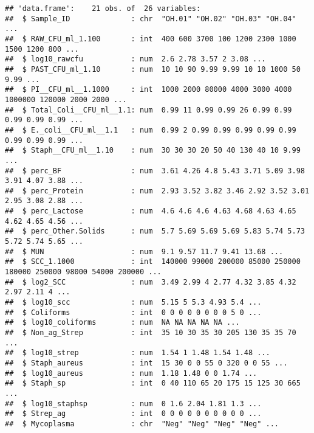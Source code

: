 \documentclass[]{article}
\begin{document}
\begin{verbatim}
## 'data.frame':    21 obs. of  26 variables:
##  $ Sample_ID              : chr  "OH.01" "OH.02" "OH.03" "OH.04" ...
##  $ RAW_CFU_ml_1.100       : int  400 600 3700 100 1200 2300 1000 1500 1200 800 ...
##  $ log10_rawcfu           : num  2.6 2.78 3.57 2 3.08 ...
##  $ PAST_CFU_ml_1.10       : num  10 10 90 9.99 9.99 10 10 1000 50 9.99 ...
##  $ PI__CFU_ml__1.1000     : int  1000 2000 80000 4000 3000 4000 1000000 120000 2000 2000 ...
##  $ Total_Coli__CFU_ml__1.1: num  0.99 11 0.99 0.99 26 0.99 0.99 0.99 0.99 0.99 ...
##  $ E._coli__CFU_ml__1.1   : num  0.99 2 0.99 0.99 0.99 0.99 0.99 0.99 0.99 0.99 ...
##  $ Staph__CFU_ml__1.10    : num  30 30 30 20 50 40 130 40 10 9.99 ...
##  $ perc_BF                : num  3.61 4.26 4.8 5.43 3.71 5.09 3.98 3.91 4.07 3.88 ...
##  $ perc_Protein           : num  2.93 3.52 3.82 3.46 2.92 3.52 3.01 2.95 3.08 2.88 ...
##  $ perc_Lactose           : num  4.6 4.6 4.6 4.63 4.68 4.63 4.65 4.62 4.65 4.56 ...
##  $ perc_Other.Solids      : num  5.7 5.69 5.69 5.69 5.83 5.74 5.73 5.72 5.74 5.65 ...
##  $ MUN                    : num  9.1 9.57 11.7 9.41 13.68 ...
##  $ SCC_1.1000             : int  140000 99000 200000 85000 250000 180000 250000 98000 54000 200000 ...
##  $ log2_SCC               : num  3.49 2.99 4 2.77 4.32 3.85 4.32 2.97 2.11 4 ...
##  $ log10_scc              : num  5.15 5 5.3 4.93 5.4 ...
##  $ Coliforms              : int  0 0 0 0 0 0 0 0 5 0 ...
##  $ log10_coliforms        : num  NA NA NA NA NA ...
##  $ Non_ag_Strep           : int  35 10 30 35 30 205 130 35 35 70 ...
##  $ log10_strep            : num  1.54 1 1.48 1.54 1.48 ...
##  $ Staph_aureus           : int  15 30 0 0 55 0 320 0 0 55 ...
##  $ log10_aureus           : num  1.18 1.48 0 0 1.74 ...
##  $ Staph_sp               : int  0 40 110 65 20 175 15 125 30 665 ...
##  $ log10_staphsp          : num  0 1.6 2.04 1.81 1.3 ...
##  $ Strep_ag               : int  0 0 0 0 0 0 0 0 0 0 ...
##  $ Mycoplasma             : chr  "Neg" "Neg" "Neg" "Neg" ...
\end{verbatim}
\end{document}
